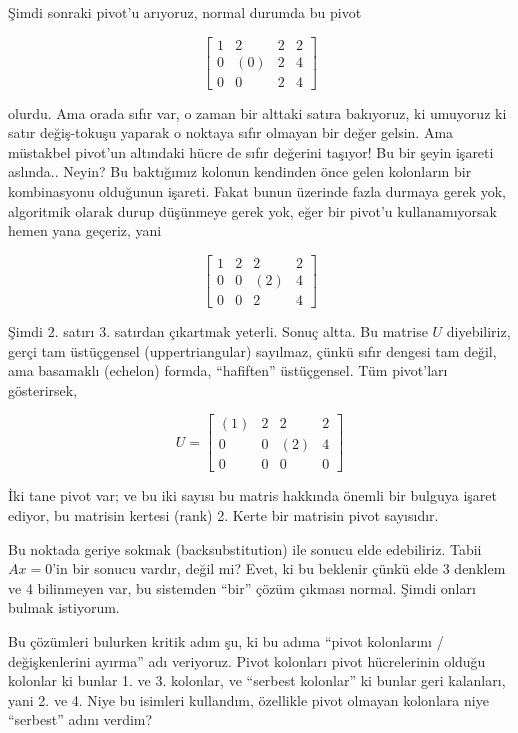 \documentclass[12pt,fleqn]{article}\usepackage{../../common}
\begin{document}
Şimdi sonraki pivot'u arıyoruz, normal durumda bu pivot

$$ 
\left[\begin{array}{cccc}
1 & 2 & 2 & 2  \\
0 & (0) & 2 & 4 \\
0 & 0 & 2 & 4
\end{array}\right]
 $$

olurdu. Ama orada sıfır var, o zaman bir alttaki satıra bakıyoruz, ki
umuyoruz ki satır değiş-tokuşu yaparak o noktaya sıfır olmayan bir değer
gelsin. Ama müstakbel pivot'un altındaki hücre de sıfır değerini taşıyor!
Bu bir şeyin işareti aslında.. Neyin? Bu baktığımız kolonun kendinden önce
gelen kolonların bir kombinasyonu olduğunun işareti. Fakat bunun üzerinde
fazla durmaya gerek yok, algoritmik olarak durup düşünmeye gerek yok, eğer
bir pivot'u kullanamıyorsak hemen yana geçeriz, yani

$$ 
\left[\begin{array}{cccc}
1 & 2 & 2 & 2  \\
0 & 0 & (2) & 4 \\
0 & 0 & 2 & 4
\end{array}\right]
 $$

Şimdi 2. satırı 3. satırdan çıkartmak yeterli. Sonuç altta. Bu matrise $U$
diyebiliriz, gerçi tam üstüçgensel (uppertriangular) sayılmaz, çünkü sıfır
dengesi tam değil, ama basamaklı (echelon) formda, ``hafiften''
üstüçgensel. Tüm pivot'ları gösterirsek,

$$ 
U = 
\left[\begin{array}{cccc}
(1) & 2 & 2 & 2  \\
0 & 0 & (2) & 4 \\
0 & 0 & 0 & 0
\end{array}\right]
 $$

İki tane pivot var; ve bu iki sayısı bu matris hakkında önemli bir bulguya
işaret ediyor, bu matrisin kertesi (rank) 2. Kerte bir matrisin pivot
sayısıdır. 

Bu noktada geriye sokmak (backsubstitution) ile sonucu elde
edebiliriz. Tabii $Ax=0$'in bir sonucu vardır, değil mi? Evet, ki bu
beklenir çünkü elde 3 denklem ve 4 bilinmeyen var, bu sistemden ``bir''
çözüm çıkması normal. Şimdi onları bulmak istiyorum.

Bu çözümleri bulurken kritik adım şu, ki bu adıma ``pivot kolonlarını /
değişkenlerini ayırma'' adı veriyoruz. Pivot kolonları pivot hücrelerinin
olduğu kolonlar ki bunlar 1. ve 3. kolonlar, ve ``serbest kolonlar'' ki
bunlar geri kalanları, yani 2. ve 4. Niye bu isimleri kullandım, özellikle
pivot olmayan kolonlara niye ``serbest'' adını verdim?
\end{document}
